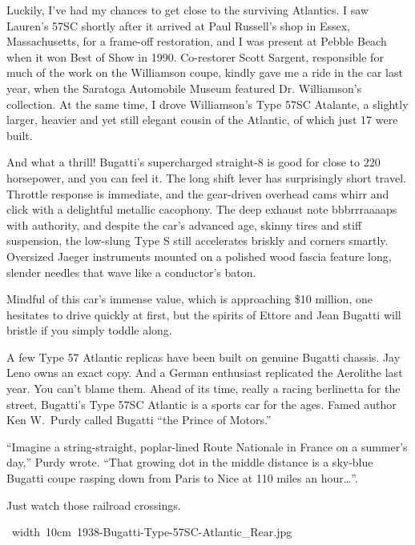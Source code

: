 Luckily, I've had my chances to get close to the surviving Atlantics.
I saw Lauren's 57SC shortly after it arrived at Paul Russell's shop in
Essex, Massachusetts, for a frame-off restoration, and I was present at
Pebble Beach when it won Best of Show in 1990. Co-restorer Scott Sargent,
responsible for much of the work on the Williamson coupe, kindly gave me
a ride in the car last year, when the Saratoga Automobile Museum
featured Dr. Williamson's collection. At the same time, I drove
Williamson's Type 57SC Atalante, a slightly larger, heavier and yet
still elegant cousin of the Atlantic, of which just 17 were built.

And what a thrill! Bugatti's supercharged straight-8 is good for close
to 220 horsepower, and you can feel it. The long shift lever has
surprisingly short travel. Throttle response is immediate, and the
gear-driven overhead cams whirr and click with a delightful metallic
cacophony. The deep exhaust note bbbrrraaaaps with authority, and
despite the car's advanced age, skinny tires and stiff suspension, the
low-slung Type S still accelerates briskly and corners smartly.
Oversized Jaeger instruments mounted on a polished wood fascia feature
long, slender needles that wave like a conductor's baton.

Mindful of this car's immense value, which is approaching \$10 million,
one hesitates to drive quickly at first, but the spirits of
Ettore and Jean Bugatti will bristle if you simply toddle along.

A few Type 57 Atlantic replicas have been built on genuine Bugatti
chassis. Jay Leno owns an exact copy. And a German enthusiast replicated
the Aerolithe last year. You can't blame them. Ahead of its time, really
a racing berlinetta for the street, Bugatti's Type 57SC Atlantic is a
sports car for the ages. Famed author Ken W.\ Purdy called Bugatti
``the Prince of Motors.''

``Imagine a string-straight, poplar-lined Route Nationale in France on a
summer's day,'' Purdy wrote. ``That growing dot in the middle distance is
a sky-blue Bugatti coupe rasping down from Paris to Nice at 110 miles
an hour\dots''.

Just watch those railroad crossings.

\vfill
\centerline{\hbox{%
 \pdfximage width 10cm
   {1938-Bugatti-Type-57SC-Atlantic_Rear.jpg}%
 \pdfrefximage\pdflastximage}}

\bye

